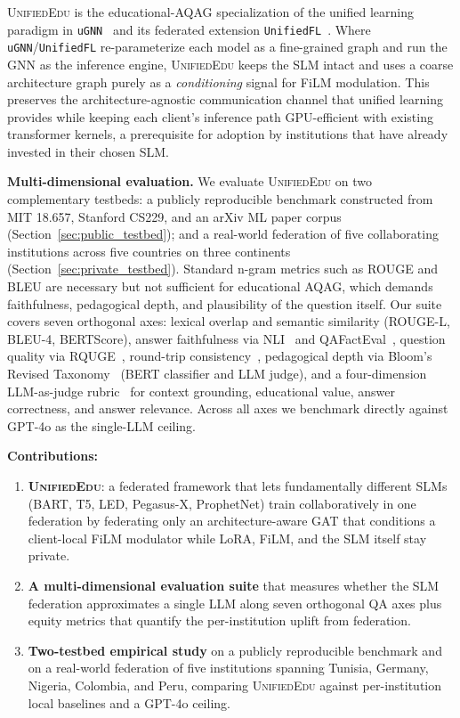 \documentclass[11pt]{article}
\theoremstyle{plain}
\theoremstyle{definition}
\theoremstyle{remark}
\newcommand{\UniEdu}{\textsc{UnifiedEdu}}
\begin{document}
\UniEdu{} is the educational-AQAG specialization of
the unified learning paradigm in
\texttt{uGNN}~\citep{pala2026ugnn} and its federated
extension \texttt{UnifiedFL}~\citep{pala2025unifiedfl}.
Where \texttt{uGNN}/\texttt{UnifiedFL} re-parameterize
each model as a fine-grained graph and run the GNN as
the inference engine, \UniEdu{} keeps the SLM intact
and uses a coarse architecture graph purely as a
\emph{conditioning} signal for FiLM modulation. This
preserves the architecture-agnostic communication
channel that unified learning provides while keeping
each client's inference path GPU-efficient with
existing transformer kernels, a prerequisite for
adoption by institutions that have already invested
in their chosen SLM.

\textbf{Multi-dimensional evaluation.}
We evaluate \UniEdu{} on two complementary testbeds: a
publicly reproducible benchmark constructed from MIT
18.657, Stanford CS229, and an arXiv ML paper corpus
(Section~\ref{sec:public_testbed}); and a real-world
federation of five collaborating institutions
across five countries on three continents
(Section~\ref{sec:private_testbed}). Standard
n-gram metrics such as ROUGE and BLEU are necessary
but not sufficient for educational AQAG, which
demands faithfulness, pedagogical depth, and
plausibility of the question itself. Our suite covers
seven orthogonal axes: lexical overlap and semantic
similarity (ROUGE-L, BLEU-4, BERTScore), answer
faithfulness via NLI~\citep{es2023ragas} and
QAFactEval~\citep{fabbri2022qafacteval},
question quality via RQUGE~\citep{mohammadshahi2023rquge},
round-trip consistency~\citep{alberti2019synthetic},
pedagogical depth via Bloom's Revised
Taxonomy~\citep{anderson2001taxonomy,
krathwohl2002revision} (BERT classifier and LLM
judge), and a four-dimension LLM-as-judge
rubric~\citep{zheng2023judging} for context grounding,
educational value, answer correctness, and answer
relevance. Across all axes we benchmark directly
against GPT-4o as the single-LLM ceiling.

\textbf{Contributions:}
\begin{enumerate}[leftmargin=2em, itemsep=2pt]
  \item \textbf{\UniEdu{}}: a federated framework that
  lets fundamentally different SLMs (BART, T5, LED,
  Pegasus-X, ProphetNet) train collaboratively in one
  federation by federating only an architecture-aware
  GAT that conditions a client-local FiLM modulator
  while LoRA, FiLM, and the SLM itself stay private.
  \item \textbf{A multi-dimensional evaluation suite}
  that measures whether the SLM federation
  approximates a single LLM along seven orthogonal QA
  axes plus equity metrics that quantify the
  per-institution uplift from federation.
  \item \textbf{Two-testbed empirical study} on a
  publicly reproducible benchmark and on a real-world
  federation of five institutions spanning Tunisia,
  Germany, Nigeria, Colombia, and Peru, comparing
  \UniEdu{} against per-institution local baselines
  and a GPT-4o ceiling.
\end{enumerate}
\end{document}
